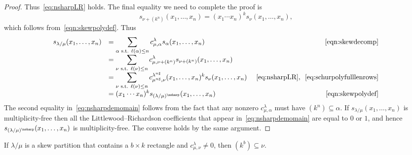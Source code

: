 \begin{proof}
Thus~\eqref{eq:nsharpLR} holds. The final equality we need to complete the proof is
\begin{equation}
\label{eq:schurpolyfulllenrows}
s_{\nu + (k^n)}(x_1,\ldots,x_n) = (x_1 \cdots x_n)^k s_{\nu}(x_1,\ldots,x_n),
\end{equation}
which follows from~\eqref{eqn:skewpolydef}. Thus
\begin{equation}
\begin{array}{rlr}
\label{eq:nsharpdemomain}
s_{\lambda / \mu}(x_1,\ldots,x_n) & = \displaystyle \sum_{\alpha \text{ s.t. }\ell(\alpha) \leq n} c_{\mu, \alpha}^{\lambda} s_{\alpha}(x_1,\ldots,x_n) &~\eqref{eqn:skewdecomp}\\
& = \displaystyle \sum_{\nu\text{ s.t. }\ell(\nu) \leq n} c_{\mu, \nu + (k^n)}^{\lambda} s_{\nu + (k^n)}(x_1,\ldots,x_n) & \\
& = \displaystyle \sum_{\nu\text{ s.t. }\ell(\nu) \leq n} c_{\mu^{n\sharp}, \nu}^{\lambda^{n\sharp}} (x_1,\ldots,x_n)^k s_{\nu}(x_1,\ldots,x_n) &~\eqref{eq:nsharpLR}\text{, }~\eqref{eq:schurpolyfulllenrows}\\
& = \displaystyle (x_1 \cdots x_n)^k s_{(\lambda / \mu)^{\nsharp }}(x_1,\ldots,x_n) &~\eqref{eqn:skewpolydef}\\
\end{array}
\end{equation}
The second equality in~\eqref{eq:nsharpdemomain} follows from the fact that any nonzero $c_{\mu, \alpha}^{\lambda}$ must have $(k^n) \subseteq \alpha$. If $s_{\lambda / \mu}(x_1,\ldots,x_n)$ is multiplicity-free then all the Littlewood--Richardson coefficients that appear in~\eqref{eq:nsharpdemomain} are equal to $0$ or $1$, and hence $s_{(\lambda / \mu)^{\nsharp }}(x_1,\ldots,x_n)$ is multiplicity-free. The converse holds by the same argument.
\end{proof}
\begin{lemma}
\label{lemma:rectanglecontent}
If $\lambda / \mu$ is a skew partition that contains a $b \times k$ rectangle and $c_{\mu, \nu}^{\lambda} \neq 0$, then $(k^b) \subseteq \nu$.
\end{lemma}

